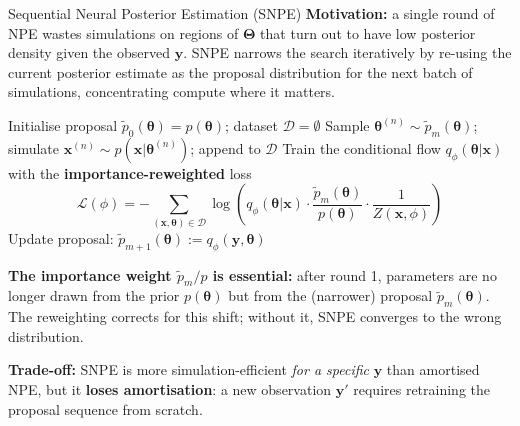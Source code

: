 \documentclass[9pt]{beamer}
\begin{document}
\begin{frame}{Sequential Neural Posterior Estimation (SNPE)}
    \footnotesize
    \textbf{Motivation:} a single round of NPE wastes simulations on regions of $\boldsymbol{\Theta}$ that turn out to have low posterior density given the observed $\mathbf{y}$. SNPE narrows the search iteratively by re-using the current posterior estimate as the proposal distribution for the next batch of simulations, concentrating compute where it matters.
    \vspace{0.2em}

    \begin{algorithm}[H]
    \caption{Sequential Neural Posterior Estimation (SNPE)}
    \begin{algorithmic}[1]
    \State Initialise proposal $\tilde{p}_0(\boldsymbol{\theta}) = p(\boldsymbol{\theta})$; dataset $\mathcal{D} = \emptyset$
        \State Sample $\boldsymbol{\theta}^{(n)} \sim \tilde{p}_m(\boldsymbol{\theta})$; simulate $\mathbf{x}^{(n)} \sim p(\mathbf{x}|\boldsymbol{\theta}^{(n)})$; append to $\mathcal{D}$
        \State Train the conditional flow $q_\phi(\boldsymbol{\theta}|\mathbf{x})$ with the \textbf{importance-reweighted} loss
        \[
        \mathcal{L}(\phi) = -\!\!\!\sum_{(\mathbf{x},\boldsymbol{\theta})\in\mathcal{D}}\!\!\log\!\left( q_\phi(\boldsymbol{\theta}|\mathbf{x}) \cdot \frac{\tilde{p}_m(\boldsymbol{\theta})}{p(\boldsymbol{\theta})} \cdot \frac{1}{Z(\mathbf{x},\phi)} \right)
        \]
        \State Update proposal: $\tilde{p}_{m+1}(\boldsymbol{\theta}) := q_\phi(\mathbf{y},\boldsymbol{\theta})$
    \EndFor
    \end{algorithmic}
    \end{algorithm}

    \footnotesize
    \textbf{The importance weight $\tilde{p}_m/p$ is essential:} after round 1, parameters are no longer drawn from the prior $p(\boldsymbol{\theta})$ but from the (narrower) proposal $\tilde{p}_m(\boldsymbol{\theta})$. The reweighting corrects for this shift; without it, SNPE converges to the wrong distribution.

    \textbf{Trade-off:} SNPE is more simulation-efficient \emph{for a specific} $\mathbf{y}$ than amortised NPE, but it \textbf{loses amortisation}: a new observation $\mathbf{y}'$ requires retraining the proposal sequence from scratch.
\end{frame}
\end{document}

